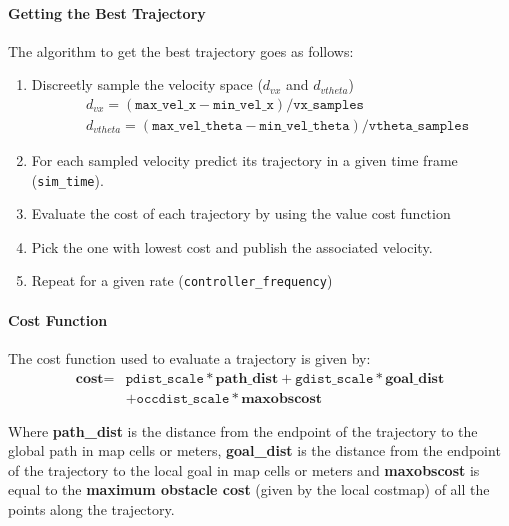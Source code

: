 \documentclass[12pt]{article}
\begin{document}
\paragraph{Getting the Best Trajectory}
The algorithm to get the best trajectory goes as follows:
\begin{enumerate}
    \item Discreetly sample the velocity space ($d_{vx}$ and $d_{vtheta}$)
    \begin{align*}
        & d_{vx}=(\texttt{max\_vel\_x}-\texttt{min\_vel\_x})/\texttt{vx\_samples}\\
         & d_{vtheta}=(\texttt{max\_vel\_theta}-\texttt{min\_vel\_theta})/\texttt{vtheta\_samples}
    \end{align*}
    \item For each sampled velocity predict its trajectory in a given time frame (\texttt{sim\_time}).
    \item Evaluate the cost of each trajectory  by using the value cost function
    \item Pick the one with lowest cost and publish the associated velocity.
    \item Repeat for a given rate (\texttt{controller\_frequency})
\end{enumerate}

\paragraph{Cost Function}
The cost function used to evaluate a trajectory is given by:
\begin{align*}
        \textbf{cost} = &
   \texttt{pdist\_scale} * \textbf{path\_dist}
   + \texttt{gdist\_scale} * \textbf{goal\_dist}\\
   &+\texttt{occdist\_scale} * \textbf{maxobscost} 
\end{align*}

Where \textbf{path\_dist} is the distance from the endpoint of the trajectory to the global path in map cells or meters, \textbf{goal\_dist} is the distance from the endpoint of the trajectory to the local goal in map cells or meters and \textbf{maxobscost} is equal to the \textbf{maximum obstacle cost} (given by the local costmap) of all the points along the trajectory.
\end{document}

